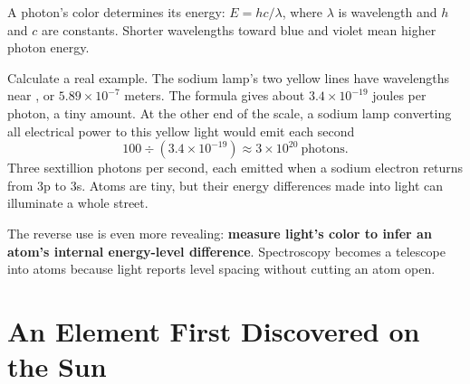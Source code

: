 \begin{qiaoliang}
A photon's color determines its energy: $E = hc/\lambda$, where $\lambda$ is wavelength and $h$ and $c$ are constants. Shorter wavelengths toward blue and violet mean higher photon energy.

Calculate a real example. The sodium lamp's two yellow lines have wavelengths near , or $5.89\times10^{-7}$ meters. The formula gives about $3.4\times10^{-19}$ joules per photon, a tiny amount. At the other end of the scale, a  sodium lamp converting all electrical power to this yellow light would emit each second
\[100 \div (3.4\times10^{-19}) \approx 3\times10^{20}\ \text{photons}.\]
Three sextillion photons per second, each emitted when a sodium electron returns from 3p to 3s. Atoms are tiny, but their energy differences made into light can illuminate a whole street.

The reverse use is even more revealing: \textbf{measure light's color to infer an atom's internal energy-level difference}. Spectroscopy becomes a telescope into atoms because light reports level spacing without cutting an atom open.
\end{qiaoliang}

\section{An Element First Discovered on the Sun}

